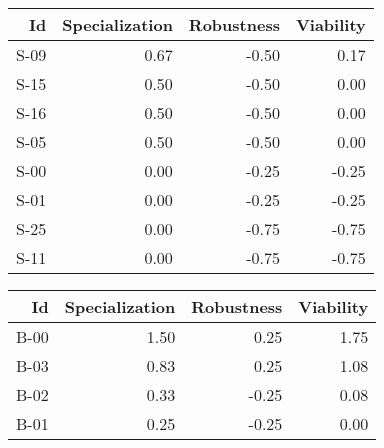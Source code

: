 


\begin{tabular}{ | r | r | r | r | }
    \hline
                    Id  &  Specialization  &      Robustness  &       Viability  \\
    \hline
    \hline
                  S-09  &            0.67  &           -0.50  &            0.17  \\
    \hline
                  S-15  &            0.50  &           -0.50  &            0.00  \\
    \hline
                  S-16  &            0.50  &           -0.50  &            0.00  \\
    \hline
                  S-05  &            0.50  &           -0.50  &            0.00  \\
    \hline
                  S-00  &            0.00  &           -0.25  &           -0.25  \\
    \hline
                  S-01  &            0.00  &           -0.25  &           -0.25  \\
    \hline
                  S-25  &            0.00  &           -0.75  &           -0.75  \\
    \hline
                  S-11  &            0.00  &           -0.75  &           -0.75  \\
    \hline
\end{tabular}


\begin{tabular}{ | r | r | r | r | }
    \hline
                    Id  &  Specialization  &      Robustness  &       Viability  \\
    \hline
    \hline
                  B-00  &            1.50  &            0.25  &            1.75  \\
    \hline
                  B-03  &            0.83  &            0.25  &            1.08  \\
    \hline
                  B-02  &            0.33  &           -0.25  &            0.08  \\
    \hline
                  B-01  &            0.25  &           -0.25  &            0.00  \\
    \hline
\end{tabular}


